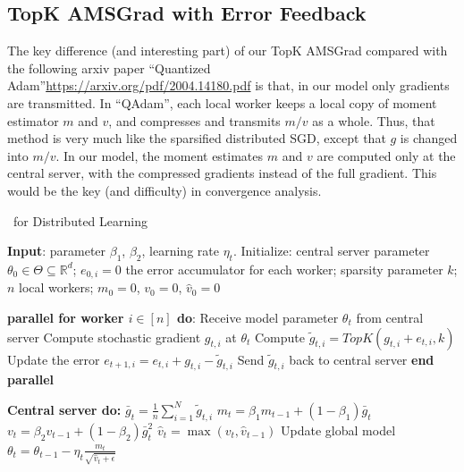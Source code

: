 \documentclass[11pt]{article}
\begin{document}
\subsection{TopK AMSGrad with Error Feedback}




The key difference (and interesting part) of our TopK AMSGrad compared with the following arxiv paper ``Quantized Adam''\url{https://arxiv.org/pdf/2004.14180.pdf} is that, in our model only gradients are transmitted. In ``QAdam'', each local worker keeps a local copy of moment estimator $m$ and $v$, and compresses and transmits $m/v$ as a whole. Thus, that method is very much like the sparsified distributed SGD, except that $g$ is changed into $m/v$. In our model, the moment estimates $m$ and $v$ are computed only at the central server, with the compressed gradients instead of the full gradient. This would be the key (and difficulty) in convergence analysis.


\begin{algorithm}[H]
\caption{\algo\ for Distributed Learning} \label{alg:sparsams}
\begin{algorithmic}[1]

\STATE \textbf{Input}: parameter $\beta_1$, $\beta_2$, learning rate $\eta_t$. 
\STATE Initialize: central server parameter $\theta_{0} \in \Theta \subseteq \mathbb R^d$; $e_{0,i}=0$ the error accumulator for each worker; sparsity parameter $k$; $n$ local workers; $m_0=0$, $v_0=0$, $\hat v_0=0$


\STATE\textbf{parallel for worker $i \in [n]$ do}:
\STATE\quad  Receive model parameter $\theta_{t}$ from central server
\STATE\quad  Compute stochastic gradient $g_{t,i}$ at $\theta_t$
\STATE\quad  Compute $\tilde g_{t,i}=TopK(g_{t,i}+e_{t,i},k)$ \label{line:topk} 
\STATE\quad  Update the error $e_{t+1,i}=e_{t,i}+g_{t,i}-\tilde g_{t,i}$
\STATE\quad  Send $\tilde g_{t,i}$ back to central server
\STATE \textbf{end parallel}

\STATE \textbf{Central server do:}
\STATE $\bar g_{t}=\frac{1}{n}\sum_{i=1}^N \tilde g_{t,i}$
\STATE $m_t=\beta_1 m_{t-1}+(1-\beta_1)\bar g_t$
\STATE $v_t=\beta_2 v_{t-1}+(1-\beta_2)\bar g_t^2$
\STATE $\hat v_t=\max(v_t,\hat v_{t-1})$ \label{line:v}
\STATE Update global model $\theta_t=\theta_{t-1}-\eta_t\frac{m_t}{\sqrt{\hat v_t+\epsilon}}$

\ENDFOR
\end{algorithmic}
\end{algorithm}
\end{document}
